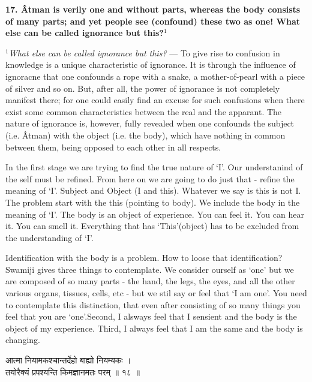 \documentclass{article}
\begin{document}
\bigskip

\textbf{ 17. Âtman is verily one and without parts, whereas the body consists
of many parts; and yet people see (confound) these two as one! What else can be
called ignorance but this?$^1$ }

{\small \textit{$^1$What else can be called
ignorance but this?} --- To give rise to confusion in knowledge is a unique
characteristic of ignorance. It is through the influence of ignoracne that one
confounds a rope with a snake, a mother-of-pearl with a piece of silver and so
on. But, after all, the power of ignorance is not completely manifest there;
for one could easily find an excuse for such confusions when there exist some
common characteristics between the real and the apparant. The nature of
ignorance is, however, fully revealed when one confounds the subject (i.e.
Âtman) with the object (i.e. the body), which have nothing in common between
them, being opposed to each other in all respects.  }


\begin{oframed}

In the first stage we are trying to find the true nature of `I'. Our
    understanind of the self must be refined. From here on we are going to do
    just that - refine the meaning of `I'. Subject and Object (I and this).
    Whatever we say is this is not I. The problem start with the this (pointing
    to body). We include the body in the meaning of `I'. The body is an object
    of experience. You can feel it. You can hear it. You can smell it.
    Everything that has `This'(object) has to be excluded from the
    understanding of `I'.

    Identification with the body is a problem. How to loose that
    identification? Swamiji gives three things to contemplate. We consider
    ourself as `one' but we are composed of so many parts - the hand, the legs,
    the eyes, and all the other various organs, tissues, cells, etc - but we
    stil say or feel that `I am one'. You need to contemplate this distinction,
    that even after consisting of so many things you feel that you are
    `one'.Second, I alsways feel that I sensient and the body is the object of
    my experience. Third, I always feel that I am the same and the body is
    changing.

\end{oframed}


\begin{large}
\begin{center}
    \begin{hindi}
    आत्मा नियामकश्चान्तर्देहो बाह्यो नियम्यकः ।\\
    तयोरैक्यं प्रपश्यन्ति किमज्ञानमतः परम् ॥ १८ ॥
    \end{hindi}
\end{center}
\end{large}
\end{document}
